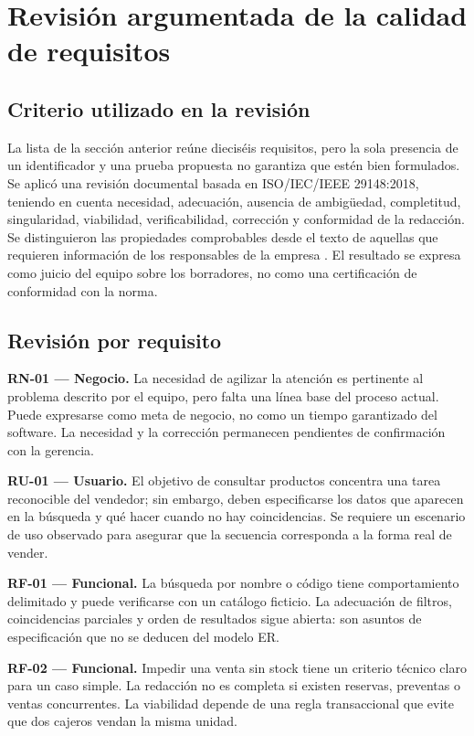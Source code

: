 \section{Revisión argumentada de la calidad de requisitos}
\subsection{Criterio utilizado en la revisión}
La lista de la sección anterior reúne dieciséis requisitos, pero la sola presencia de un identificador y una prueba propuesta no garantiza que estén bien formulados. Se aplicó una revisión documental basada en ISO/IEC/IEEE 29148:2018, teniendo en cuenta necesidad, adecuación, ausencia de ambigüedad, completitud, singularidad, viabilidad, verificabilidad, corrección y conformidad de la redacción. Se distinguieron las propiedades comprobables desde el texto de aquellas que requieren información de los responsables de la empresa \cite{iso29148}. El resultado se expresa como juicio del equipo sobre los borradores, no como una certificación de conformidad con la norma.

\subsection{Revisión por requisito}
\textbf{RN-01 — Negocio.} La necesidad de agilizar la atención es pertinente al problema descrito por el equipo, pero falta una línea base del proceso actual. Puede expresarse como meta de negocio, no como un tiempo garantizado del software. La necesidad y la corrección permanecen pendientes de confirmación con la gerencia.

\textbf{RU-01 — Usuario.} El objetivo de consultar productos concentra una tarea reconocible del vendedor; sin embargo, deben especificarse los datos que aparecen en la búsqueda y qué hacer cuando no hay coincidencias. Se requiere un escenario de uso observado para asegurar que la secuencia corresponda a la forma real de vender.

\textbf{RF-01 — Funcional.} La búsqueda por nombre o código tiene comportamiento delimitado y puede verificarse con un catálogo ficticio. La adecuación de filtros, coincidencias parciales y orden de resultados sigue abierta: son asuntos de especificación que no se deducen del modelo ER.

\textbf{RF-02 — Funcional.} Impedir una venta sin stock tiene un criterio técnico claro para un caso simple. La redacción no es completa si existen reservas, preventas o ventas concurrentes. La viabilidad depende de una regla transaccional que evite que dos cajeros vendan la misma unidad.

